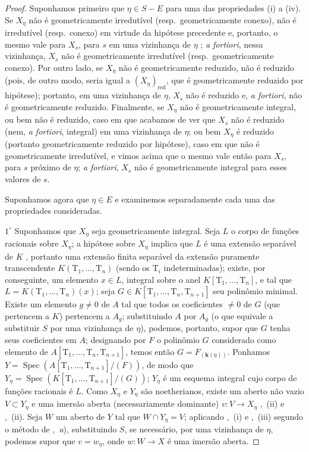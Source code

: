 \begin{proof}
Suponhamos primeiro que $\eta\in S-E$ para uma das propriedades (i) a (iv).
Se $X_\eta$ não é geometricamente irredutível (resp.\ geometricamente conexo), não é irredutível (resp.\ conexo) em virtude da hipótese precedente e, portanto, o mesmo vale para $X_s$, para $s$ em uma vizinhança de $\eta$ ; \emph{a fortiori}, nessa vizinhança, $X_s$ não é geometricamente irredutível (resp.\ geometricamente conexo).
Por outro lado, se $X_\eta$ não é geometricamente reduzido, não é reduzido (pois, de outro modo, seria igual a $(X_\eta)_\mathrm{red}$, que é geometricamente reduzido por hipótese); portanto, em uma vizinhança de $\eta$, $X_s$ não é reduzido  e, \emph{a fortiori}, não é geometricamente reduzido.
Finalmente, se $X_\eta$ não é geometricamente integral, ou bem não é reduzido, caso em que acabamos de ver que $X_s$ não é reduzido (nem, \emph{a fortiori}, integral) em uma vizinhança de $\eta$; ou bem $X_\eta$ é reduzido (portanto geometricamente reduzido por hipótese), caso em que não é geometricamente irredutível, e vimos acima que o mesmo vale então para $X_s$, para $s$ próximo de $\eta$; \emph{a fortiori}, $X_s$ não é geometricamente integral para esses valores de $s$.

Suponhamos agora que $\eta\in E$ e examinemos separadamente cada uma das propriedades consideradas.

$1^\circ$ Suponhamos que $X_\eta$ seja geometricamente integral.
Seja $L$ o corpo de funções racionais sobre $X_\eta$; a hipótese sobre $X_\eta$ implica que $L$ é uma extensão separável de $K$ , portanto uma extensão finita separável da extensão puramente transcendente $K(\mathrm{T}_1,\ldots,\mathrm{T}_n)$ (sendo os $\mathrm{T}_i$ indeterminadas); existe, por conseguinte, um elemento $x\in L$, integral sobre o anel $K[\mathrm{T}_1,\ldots,\mathrm{T}_n]$, e tal que $L=K(\mathrm{T}_1,\ldots,\mathrm{T}_n)(x)$; seja $G\in K[\mathrm{T}_1,\ldots,\mathrm{T}_n,\mathrm{T}_{n+1}]$ seu polinômio minimal.
Existe um elemento $g\neq 0$ de $A$ tal que todos os coeficientes $\neq 0$ de $G$ (que pertencem a $K$) pertencem a $A_g$; substituindo $A$ por $A_g$ (o que equivale a substituir $S$ por uma vizinhança de $\eta$), podemos, portanto, supor que $G$ tenha seus coeficientes em $A$; designando por $F$ o polinômio $G$ considerado como elemento de $A[\mathrm{T}_1,\ldots,\mathrm{T}_n,\mathrm{T}_{n+1}]$, temos então $G=F_{(\boldsymbol{k}(\eta))}$.
Ponhamos $Y=\operatorname{Spec}(A[\mathrm{T}_1,\ldots,\mathrm{T}_{n+1}]/(F))$, de modo que $Y_\eta=\operatorname{Spec}(K[\mathrm{T}_1,\ldots,\mathrm{T}_{n+1}]/(G))$; $Y_\eta$ é um esquema integral cujo corpo de funções racionais é $L$.
Como $X_\eta$ e $Y_\eta$ são noetherianos, existe um aberto não vazio $V\subset Y_\eta$ e uma imersão aberta (necessariamente dominante) $v:V\to X_\eta$ ,~(ii) e ,~(ii).
Seja $W$ um aberto de $Y$ tal que $W\cap Y_\eta=V$; aplicando ,~(i) e ,~(iii) segundo o método de ,~\emph{a}), substituindo $S$, se necessário, por uma vizinhança de $\eta$, podemos supor que $v=w_\eta$, onde $w:W\to X$ é uma imersão aberta.


\end{proof}
